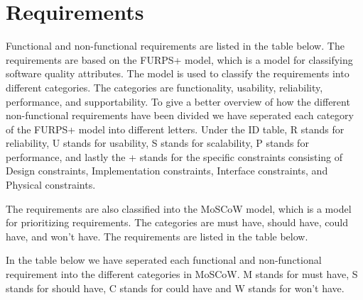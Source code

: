 
\section{Requirements}

Functional and non-functional requirements are listed in the table below. The requirements are based on the FURPS+ model, which is a model for classifying software quality attributes\cite{2}. The model is used to classify the requirements into different categories. The categories are functionality, usability, reliability, performance, and supportability.
To give a better overview of how the different non-functional requirements have been divided we have seperated each category of the FURPS+ model into different letters. Under the ID table, R stands for reliability, U stands for usability, S stands for scalability, P stands for performance, and lastly the + stands for the specific constraints consisting of Design constraints, Implementation constraints, Interface constraints, and Physical constraints. \newline

The requirements are also classified into the MoSCoW model, which is a model for prioritizing requirements. The categories are must have, should have, could have, and won't have. The requirements are listed in the table below. \newline

In the table below we have seperated each functional and non-functional requirement into the different categories in MoSCoW\cite{3}. M stands for must have, S stands for should have, C stands for could have and W stands for won't have.\newline

